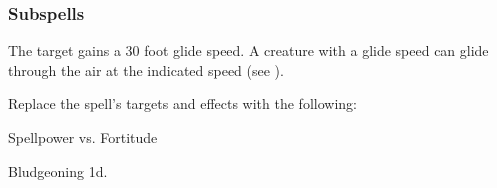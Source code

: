 \subsubsection{Subspells}



The target gains a 30 foot glide speed.
A creature with a glide speed can glide through the air at the indicated speed (see ).









Replace the spell's targets and effects with the following:
\begin{spellcontent}

\begin{augmenttargetinginfo}



\end{augmenttargetinginfo}


\begin{augmenteffects}




\begin{spellattack}{Spellpower vs. Fortitude}


\hit Bludgeoning  \plus1d.


\end{spellattack}





\end{augmenteffects}

\end{spellcontent}








